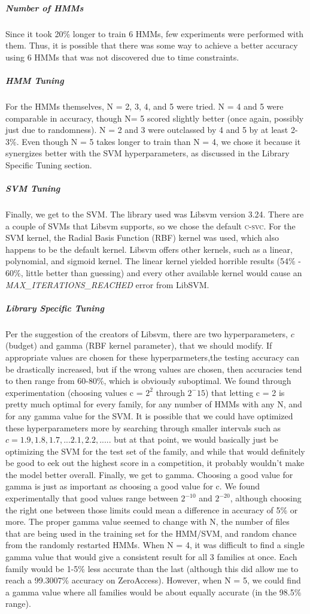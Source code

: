 \documentclass[12pt]{article}
\begin{document}
  \subparagraph{Number of HMMs}
Since it took 20\% longer to train 6 HMMs, few experiments were performed with them. Thus, it is possible that there was some way to achieve a better accuracy using 6 HMMs that was not discovered due to time constraints.
  \subparagraph{HMM Tuning}
For the HMMs themselves, N = 2, 3, 4, and 5 were tried. N = 4 and 5 were comparable in accuracy, though N= 5 scored slightly better (once again, possibly just due to randomness). N = 2 and 3 were outclassed by 4 and 5 by at least 2-3\%. Even though N = 5 takes longer to train than N = 4, we chose it because it synergizes better with the SVM hyperparameters, as discussed in the Library Specific Tuning section.
  \subparagraph{SVM Tuning}
  Finally, we get to the SVM. The library used was Libsvm version 3.24. There are a couple of SVMs that Libsvm supports, so we chose the default \textsc{c-svc}. For the SVM kernel, the Radial Basis Function (RBF) kernel was used, which also happens to be the default kernel. Libsvm offers other kernels, such as a linear, polynomial, and sigmoid kernel. The linear kernel yielded horrible results (54\% - 60\%, little better than guessing) and every other available kernel would cause an \textit{MAX\_ITERATIONS\_REACHED} error from LibSVM.
  \subparagraph{Library Specific Tuning}
  Per the suggestion of the creators of Libsvm, there are two hyperparameters, $c$ (budget) and gamma (RBF kernel parameter), that we should modify. If appropriate values are chosen for these hyperparmeters,the testing accuracy can be drastically increased, but if the wrong values are chosen, then accuracies tend to then range from 60-80\%, which is obviously suboptimal.  We found through experimentation (choosing values c = $2^2$ through $2^-15$) that letting c = 2 is pretty much optimal for every family, for any number of HMMs with any N, and for any gamma value for the SVM. It is possible that we could have optimized these hyperparameters more by searching through smaller intervals such as $c = 1.9, 1.8, 1.7, ... 2.1, 2.2, .....$ but at that point, we would basically just be optimizing the SVM for the test set of the family, and while that would definitely be good to eek out the highest score in a competition, it probably wouldn't make the model better overall. Finally, we get to gamma. Choosing a good value for gamma is just as important as choosing a good value for c. We found experimentally that good values range between $2^{-10}$ and $2^{-20}$, although choosing the right one between those limits could mean a difference in accuracy of 5\% or more.
The proper gamma value seemed to change with N, the number of files that are being used in the training set for the HMM/SVM, and random chance from the randomly restarted HMMs. When N = 4, it was difficult to find a single gamma value that would give a consistent result for all 3 families at once. Each family would be 1-5\% less accurate than the last (although this did allow me to reach a 99.3007\% accuracy on ZeroAccess). However, when N = 5, we could find a gamma value where all families would be about equally accurate (in the 98.5\% range). 
\end{document}
